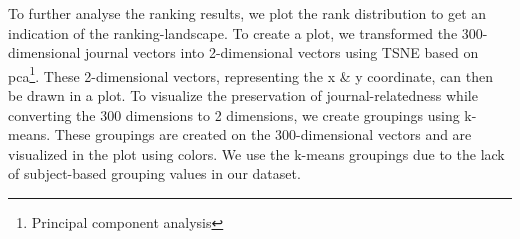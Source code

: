\documentclass[../../Thesis.tex]{subfiles}
\begin{document}
To further analyse the ranking results, we plot the rank distribution to get an indication of the ranking-landscape.
To create a plot, we transformed the 300-dimensional journal vectors into 2-dimensional vectors using TSNE based on pca\footnote{Principal component analysis}. These 2-dimensional vectors, representing the x \& y coordinate, can then be drawn in a plot. To visualize the preservation of journal-relatedness while converting the 300 dimensions to 2 dimensions, we create groupings using k-means. These groupings are created on the 300-dimensional vectors and are visualized in the plot using colors. We use the k-means groupings due to the lack of subject-based grouping values in our dataset.
\end{document}
